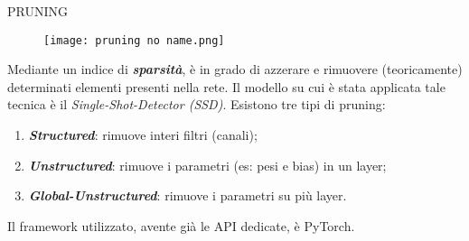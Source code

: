 \begin{frame}{PRUNING}
    \begin{figure}
        \texttt{[image: pruning no name.png]}
    \end{figure}
    Mediante un indice di {\bfseries{\emph{sparsità}}}, è in grado di azzerare e rimuovere (teoricamente) determinati elementi presenti nella rete.
    Il modello su cui è stata applicata tale tecnica è il \emph{Single-Shot-Detector (SSD)}.
    Esistono tre tipi di pruning:
    \begin{enumerate}
        \item {\bfseries{\emph{Structured}}}: rimuove interi filtri (canali);
        \item {\bfseries{\emph{Unstructured}}}: rimuove i parametri (es: pesi e bias) in un layer;
        \item {\bfseries{\emph{Global-Unstructured}}}: rimuove i parametri su più layer.
    \end{enumerate}
    Il framework utilizzato, avente già le API dedicate, è PyTorch.
\end{frame}